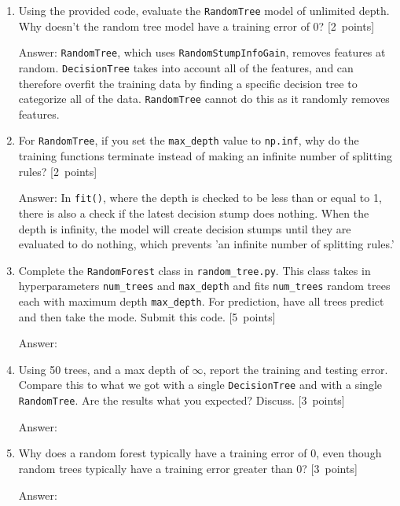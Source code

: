 \documentclass{article}
\newcommand{\blu}[1]{{\textcolor{blu}{#1}}}
\newenvironment{answer}{\par\begingroup\color{gre}Answer: }{\endgroup}
\let\ask\blu
\newcommand\pts[1]{\textcolor{pointscolour}{[#1~points]}}
\begin{document}
    \begin{enumerate}
        \item Using the provided code, evaluate the \texttt{RandomTree} model of unlimited depth. \ask{Why doesn't the random tree model have a training error of 0?} \pts{2}
        \begin{answer}
        \texttt{RandomTree}, which uses \texttt{RandomStumpInfoGain}, removes features at random. \texttt{DecisionTree} takes into account all of the features, and can therefore overfit the training data by finding a specific decision tree to categorize all of the data. \texttt{RandomTree} cannot do this as it randomly removes features.
        \end{answer}
        \item For \texttt{RandomTree}, if you set the \texttt{max\_depth} value to \texttt{np.inf}, \ask{why do the training functions terminate instead of making an infinite number of splitting rules?} \pts{2}
        \begin{answer}
        In \texttt{fit()}, where the depth is checked to be less than or equal to 1, there is also a check if the latest decision stump does nothing. When the depth is infinity, the model will create decision stumps until they are evaluated to do nothing, which prevents 'an infinite number of splitting rules.'
        \end{answer}
        \item Complete the \texttt{RandomForest} class in \texttt{random\string_tree.py}. This class takes in hyperparameters \texttt{num\string_trees} and \texttt{max\string_depth} and
        fits \texttt{num\string_trees} random trees each with maximum depth \texttt{max\string_depth}. For prediction, have all trees predict and then take the mode. \ask{Submit this code.} \pts{5}
        \begin{answer}

        \end{answer}
        \item Using 50 trees, and a max depth of $\infty$, \ask{report the training and testing error}. Compare this to what we got with a single \texttt{DecisionTree} and with a single \texttt{RandomTree}. \ask{Are the results what you expected? Discuss.} \pts{3}
        \begin{answer}

        \end{answer}
        \item \ask{Why does a random forest typically have a training error of 0, even though random trees typically have a training error greater than 0?} \pts{3}
        \begin{answer}

        \end{answer}
    \end{enumerate}
\end{document}
